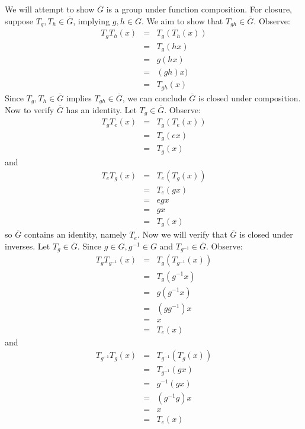 \documentclass{article}
\begin{document}
We will attempt to show $\overline{G}$ is a group under function composition. For closure, suppose 
$T_g, T_h \in \overline{G}$, implying $g,h \in G$. We aim to show that $T_{gh} \in \overline{G}$. Observe:
\begin{eqnarray*}
T_gT_h(x)&=&T_g(T_h(x)) \\
&=& T_g(hx) \\
&=& g(hx) \\
&=& (gh)x) \\
&=& T_{gh}(x)
\end{eqnarray*}
Since $T_g,T_h \in \overline{G}$ implies $T_{gh} \in \overline{G}$, we can conclude $\overline{G}$ is
closed under composition. Now to verify $\overline{G}$ has an identity. Let $T_g \in \overline{G}$. Observe:
\begin{eqnarray*}
T_gT_e(x) &=& T_g(T_e(x)) \\
&=& T_g(ex) \\
&=& T_g(x)
\end{eqnarray*} and
\begin{eqnarray*}
T_eT_g(x) &=& T_e(T_g(x)) \\
&=& T_e(gx) \\
&=& egx \\
&=& gx \\
&=& T_g(x)
\end{eqnarray*} so $\overline{G}$ contains an identity, namely $T_e$. Now we will verify that $\overline{G}$
is closed under inverses. Let $T_g \in \overline{G}$. Since $g \in G, g^{-1} \in G$  and 
$T_{g^{-1}} \in \overline{G}$. Observe:
\begin{eqnarray*}
T_gT_{g^{-1}}(x) &=& T_g(T_{g^{-1}}(x)) \\
&=& T_g(g^{-1}x) \\
&=& g(g^{-1}x) \\ 
&=& (gg^{-1})x \\ 
&=& x \\ 
&=& T_e(x)
\end{eqnarray*} and
\begin{eqnarray*}
T_{g^{-1}}T_g(x) &=& T_{g^{-1}}(T_g(x)) \\
&=& T_{g^{-1}}(gx) \\
&=& g^{-1}(gx) \\
&=& (g^{-1}g)x \\
&=& x \\
&=& T_e(x)
\end{eqnarray*}
\end{document}
